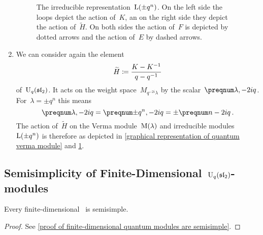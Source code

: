 \documentclass[a4paper, 11pt, oneside]{scrartcl}
\begin{document}
\begin{remark}
\begin{enumerate}
\begin{figure}
\begin{center}
        \end{center}
        \caption{
          The irreducible representation~$\operatorname{L}(\pm q^n)$.
          On the left side the loops depict the action of~$K$, an on the right side they depict the action of~$\widetilde{H}$.
          On both sides the action of~$F$ is depicted by dotted arrows and the action of~$E$ by dashed arrows.
        }
        \label{graphical representation of irreducible quantum representation}
      \end{figure}
    \item
      We can consider again the element
      \[
        \widetilde{H}
        \coloneqq
        \frac{K - K^{-1}}{q - q^{-1}}
      \]
      of~$\operatorname{U}_q(\mathfrak{sl}_2)$.
      It acts on the weight space~$M_{q^{-2i} \lambda}$ by the scalar~$\qnum{\lambda, -2i}$.
      For~$\lambda = \pm q^n$ this means
      \[
        \qnum{\lambda, -2i}
        =
        \qnum{\pm q^n, -2i}
        =
        \pm \qnum{n - 2i} \,.
      \]
      The action of~$\widetilde{H}$ on the Verma module~$\operatorname{M}(\lambda)$ and irreducible modules~$\operatorname{L}(\pm q^n)$ is therefore as depicted in \cref{graphical representation of quantum verma module} and \cref{graphical representation of irreducible quantum representation}.
  \end{enumerate}
\end{remark}



\subsection{Semisimplicity of Finite-Dimensional~$\operatorname{U}_q(\mathfrak{sl}_2)$-modules}

\begin{theorem}
  \label{finite-dimensional quantum modules are semisimple}
  Every finite-dimensional~ is semisimple.
\end{theorem}

\begin{proof}[Proof]
  See \cref{proof of finite-dimensional quantum modules are semisimple}.
\end{proof}
  
\end{document}
